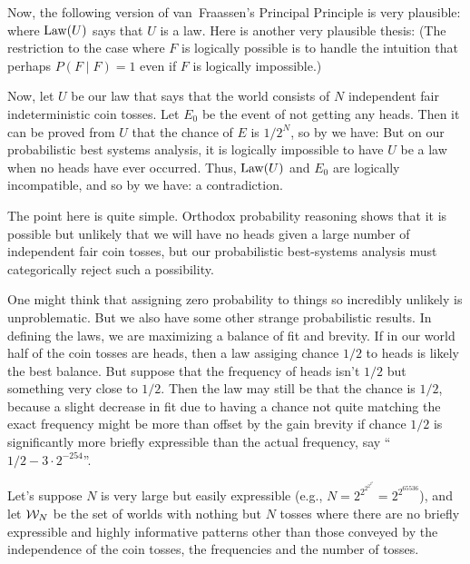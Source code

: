 Now, the following version of van~Fraassen's Principal Principle is very plausible:
where $\operatorname{Law}(U)$ says that $U$ is a law.
Here is another very plausible thesis:
(The restriction to the case where $F$ is logically possible is to handle the intuition that perhaps $P(F \mid F)=1$
even if $F$ is logically impossible.)

Now, let $U$ be our law that says that the world consists of $N$ independent fair indeterministic coin tosses. Let $E_0$ be the event
of not getting any heads. Then it can be proved from $U$ that the chance of $E$ is $1/2^N$, so by  we have:
But on our probabilistic best systems analysis, it is logically impossible to have $U$ be a law when no heads have ever occurred.
Thus, $\operatorname{Law}(U)$ and $E_0$ are logically incompatible, and so by  we have:
a contradiction.

The point here is quite simple. Orthodox probability reasoning shows that it is possible but unlikely that we will have no heads given
a large number of independent fair coin tosses, but our probabilistic best-systems analysis must categorically reject such a possibility.

One might think that assigning zero probability to things so incredibly unlikely is unproblematic. But we also have some other strange
probabilistic results. In defining the laws, we are maximizing a balance of fit and brevity. If in our world half of the coin tosses 
are heads, then a law assiging chance $1/2$ to heads is likely the best balance. But suppose that the frequency of heads isn't $1/2$
but something very close to $1/2$. Then the law may still be that the chance is $1/2$, because a slight decrease in fit due to having
a chance not quite matching the exact frequency might be more than offset by the gain brevity if chance $1/2$ is significantly more
briefly expressible than the actual frequency, say ``$1/2-3\cdot 2^{-254}$''. 

Let's suppose $N$ is very large but easily expressible (e.g., $N=2^{2^{2^{2^{2^2}}}}=2^{2^{65536}}$), and let $\mathcal W_N$ be 
the set of worlds with nothing but $N$ tosses where there are no briefly expressible and highly informative patterns other than 
those conveyed by the independence of the coin tosses, the frequencies and the number of tosses.

